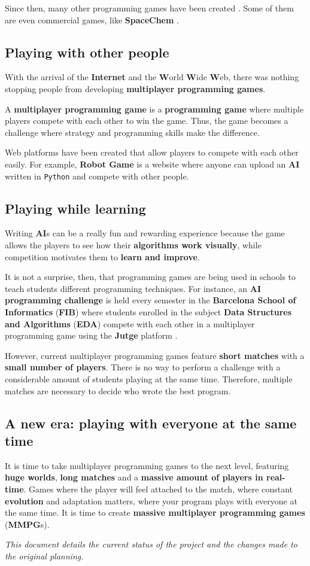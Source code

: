 \documentclass[a4paper,11pt]{article}
\begin{document}
Since then, many other programming games have been created \cite{pg}. Some of them are even commercial games, like
\textbf{SpaceChem} \cite{spacechem}.
\subsection{Playing with other people}
With the arrival of the \textbf{Internet} and the \textbf{W}orld \textbf{W}ide \textbf{W}eb, there was nothing stopping people from
developing \textbf{multiplayer programming games}.

A \textbf{multiplayer programming game} is a \textbf{programming game} where multiple players compete with each other to win the
game. Thus, the game becomes a challenge where strategy and programming skills make the difference.

Web platforms have been created that allow players to compete with each other easily. For example, \textbf{Robot Game}
\cite{robotgame} is a website where anyone can upload an \textbf{AI} written in \texttt{Python} and compete with other people.
\subsection{Playing while learning}
Writing \textbf{AI}s can be a really fun and rewarding experience because the game allows the players to see how their
\textbf{algorithms work visually}, while competition motivates them to \textbf{learn and improve}.

It is not a surprise, then, that programming games are being used in schools to teach students different programming
techniques. For instance, an \textbf{AI programming challenge} is held every semester in the \textbf{Barcelona School of
Informatics} (\textbf{FIB}) where students enrolled in the subject \textbf{Data Structures and Algorithms} (\textbf{EDA}) \cite{eda}
compete with each other in a multiplayer programming game using the \textbf{Jutge} platform \cite{jutge}.

However, current multiplayer programming games feature \textbf{short matches} with a \textbf{small number of players}. There
is no way to perform a challenge with a considerable amount of students playing at the same time. Therefore, multiple
matches are necessary to decide who wrote the best program.
\subsection{A new era: playing with everyone at the same time}
It is time to take multiplayer programming games to the next level, featuring \textbf{huge worlds}, \textbf{long matches} and
a \textbf{massive amount of players in real-time}. Games where the player will feel attached to the match, where constant
\textbf{evolution} and adaptation matters, where your program plays with everyone at the same time. It is time to create
\textbf{massive multiplayer programming games} (\textbf{MMPG}s).
\clearpage
\vspace*{\fill}
\begin{center}
\emph{This document details the current status of the project and the changes made to the original planning.}
\end{center}
\vfill
\clearpage
\end{document}
